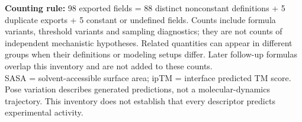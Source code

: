 \documentclass{article}
\begin{document}
{\fontsize{11.5}{15}\selectfont
\textbf{Counting rule:} 98 exported fields = 88 distinct nonconstant definitions + 5 duplicate exports + 5 constant or undefined fields.
Counts include formula variants, threshold variants and sampling diagnostics; they are not counts of independent mechanistic hypotheses.
Related quantities can appear in different groups when their definitions or modeling setups differ. Later follow-up formulas overlap this inventory and are not added to these counts.\\[5pt]
SASA = solvent-accessible surface area; ipTM = interface predicted TM score. Pose variation describes generated predictions, not a molecular-dynamics trajectory.
This inventory does not establish that every descriptor predicts experimental activity.}
\end{document}
